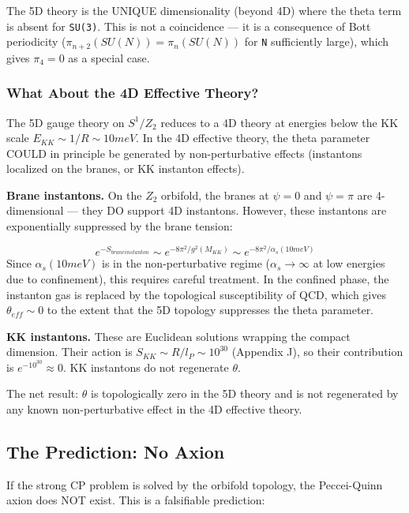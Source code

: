 \documentclass[aps,prd,preprint,superscriptaddress,longbibliography,floatfix]{revtex4-2}
\theoremstyle{remark}
\begin{document}
The 5D theory is the UNIQUE dimensionality (beyond 4D) where the theta term is absent for \texttt{SU(3)}. This is not a coincidence --- it is a consequence of Bott periodicity ($\pi_{n+2}(SU(N)) = \pi_n(SU(N))$ for \texttt{N} sufficiently large), which gives $\pi_{4} = 0$ as a special case.


\subsubsection{What About the 4D Effective Theory?}

The 5D gauge theory on $S^{1}/Z_{2}$ reduces to a 4D theory at energies below the KK scale $E_{KK} \sim  1/R \sim  10 meV$. In the 4D effective theory, the theta parameter COULD in principle be generated by non-perturbative effects (instantons localized on the branes, or KK instanton effects).

\textbf{Brane instantons.} On the $Z_{2}$ orbifold, the branes at $\psi = 0$ and $\psi = \pi$ are 4-dimensional --- they DO support 4D instantons. However, these instantons are exponentially suppressed by the brane tension:


\begin{equation}
    e^{-S_{brane instanton}} \sim  e^{-8\pi^{2}/g^{2}(M_{KK})} \sim  e^{-8\pi^{2}/\alpha_s(10 meV)}
\end{equation}
Since $\alpha_s(10 meV)$ is in the non-perturbative regime ($\alpha_s \to \infty$ at low energies due to confinement), this requires careful treatment. In the confined phase, the instanton gas is replaced by the topological susceptibility of QCD, which gives $\theta_{eff} \sim  0$ to the extent that the 5D topology suppresses the theta parameter.

\textbf{KK instantons.} These are Euclidean solutions wrapping the compact dimension. Their action is $S_{KK} \sim  R/l_P \sim  10^{30}$ (Appendix J), so their contribution is $e^{-10^{30}} \approx 0$. KK instantons do not regenerate $\theta$.

The net result: $\theta$ is topologically zero in the 5D theory and is not regenerated by any known non-perturbative effect in the 4D effective theory.


\subsection{The Prediction: No Axion}

If the strong CP problem is solved by the orbifold topology, the Peccei-Quinn axion does NOT exist. This is a falsifiable prediction:
\end{document}
